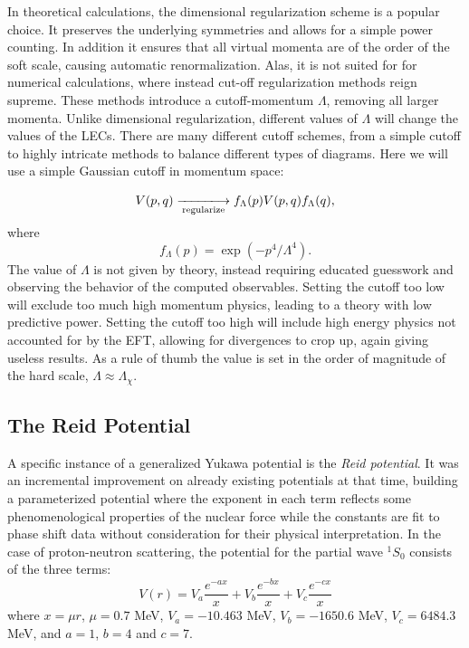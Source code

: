 In theoretical calculations, the dimensional regularization scheme is a
popular choice\cite[p~.41]{lepage1997renormalize}. It preserves the underlying
symmetries and allows for a simple power
counting\cite[p~.5]{steele1998regularization}. In addition it ensures that all
virtual momenta are of the order of the soft scale, causing automatic
renormalization. Alas, it is not suited for for numerical
calculations\cite{steele1998regularization}, where instead cut-off regularization
methods reign supreme. These methods introduce a
cutoff-momentum \(\Lambda\), removing all larger momenta. Unlike dimensional
regularization, different values of \(\Lambda\) will change the values of the LECs.
There are many different cutoff schemes, from a simple cutoff to highly
intricate methods to balance different types of diagrams. Here we will use a
simple Gaussian cutoff in momentum space:

\begin{equation*}
  V(p, q)
  \xlongrightarrow[\text{regularize}]{} f_{\Lambda}(p)V(p, q)f_{\Lambda}(q),
\end{equation*}
where
\begin{equation*}
  f_{\Lambda}(p) = \exp\left( -p^{4}/\Lambda^{4} \right).
\end{equation*}
The value of \(\Lambda\) is not given by theory, instead requiring educated
guesswork and observing the behavior of the computed observables. Setting the
cutoff too low will exclude too much high momentum physics, leading to a theory
with low predictive power. Setting the cutoff too high will include high energy
physics not accounted for by the EFT, allowing for divergences to crop up,
again giving useless results. As a rule of thumb the value is set in the order
of magnitude of the hard scale, \(\Lambda\approx \Lambda_{\chi}\)\cite[p~.41]{EPELBAUM2012343}.


\subsection{The Reid Potential}
\label{sec:reid-potential}

A specific instance of a generalized Yukawa potential is the \textit{Reid
  potential}\cite{reid}. It was an incremental improvement on already existing potentials
at that time, building a parameterized potential where the exponent in each term reflects some
phenomenological properties of the nuclear force while the constants are fit to
phase shift data without consideration for their physical interpretation.
In the case of proton-neutron scattering, the potential for the partial wave
\(^{1}S_{0}\) consists of the three terms:
\begin{equation*}
  V(r) = V_{a}\frac{e^{-ax}}{x} + V_{b}\frac{e^{-bx}}{x} + V_{c}\frac{e^{-cx}}{x}
\end{equation*}
where \(x=\mu r\), \(\mu=0.7\) MeV, \(V_{a}=-10.463\) MeV, \(V_{b}=-1650.6\)
MeV, \(V_{c}=6484.3\) MeV, and \(a=1\), \(b=4\) and \(c=7\).

